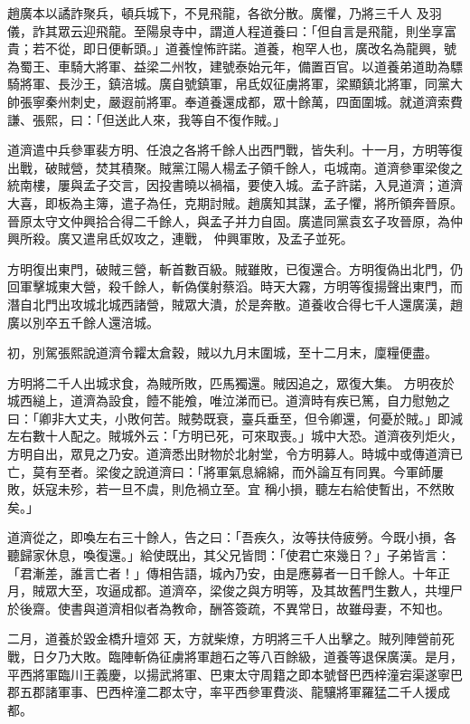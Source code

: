 \begin{pinyinscope}
 趙廣本以譎詐聚兵，頓兵城下，不見飛龍，各欲分散。廣懼，乃將三千人
 及羽儀，詐其眾云迎飛龍。至陽泉寺中，謂道人程道養曰：「但自言是飛龍，則坐享富貴；若不從，即日便斬頭。」道養惶怖許諾。道養，枹罕人也，廣改名為龍興，號為蜀王、車騎大將軍、益梁二州牧，建號泰始元年，備置百官。以道養弟道助為驃騎將軍、長沙王，鎮涪城。廣自號鎮軍，帛氐奴征虜將軍，梁顯鎮北將軍，同黨大帥張寧秦州刺史，嚴遐前將軍。奉道養還成都，眾十餘萬，四面圍城。就道濟索費謙、張熙，曰：「但送此人來，我等自不復作賊。」



 道濟遣中兵參軍裴方明、任浪之各將千餘人出西門戰，皆失利。十一月，方明等復出戰，破賊營，焚其積聚。賊黨江陽人楊孟子領千餘人，屯城南。道濟參軍梁俊之統南樓，屢與孟子交言，因投書曉以禍福，要使入城。孟子許諾，入見道濟；道濟大喜，即板為主簿，遣子為任，克期討賊。趙廣知其謀，孟子懼，將所領奔晉原。晉原太守文仲興拾合得二千餘人，與孟子并力自固。廣遣同黨袁玄子攻晉原，為仲興所殺。廣又遣帛氐奴攻之，連戰，
 仲興軍敗，及孟子並死。



 方明復出東門，破賊三營，斬首數百級。賊雖敗，已復還合。方明復偽出北門，仍回軍擊城東大營，殺千餘人，斬偽僕射蔡滔。時天大霧，方明等復揚聲出東門，而潛自北門出攻城北城西諸營，賊眾大潰，於是奔散。道養收合得七千人還廣漢，趙廣以別卒五千餘人還涪城。



 初，別駕張熙說道濟令糶太倉穀，賊以九月末圍城，至十二月末，廩糧便盡。



 方明將二千人出城求食，為賊所敗，匹馬獨還。賊因追之，眾復大集。
 方明夜於城西縋上，道濟為設食，饐不能飧，唯泣涕而已。道濟時有疾已篤，自力慰勉之曰：「卿非大丈夫，小敗何苦。賊勢既衰，臺兵垂至，但令卿還，何憂於賊。」即減左右數十人配之。賊城外云：「方明已死，可來取喪。」城中大恐。道濟夜列炬火，方明自出，眾見之乃安。道濟悉出財物於北射堂，令方明募人。時城中或傳道濟已亡，莫有至者。梁俊之說道濟曰：「將軍氣息綿綿，而外論互有同異。今軍師屢敗，妖寇未殄，若一旦不虞，則危禍立至。宜
 稱小損，聽左右給使暫出，不然敗矣。」



 道濟從之，即喚左右三十餘人，告之曰：「吾疾久，汝等扶侍疲勞。今既小損，各聽歸家休息，喚復還。」給使既出，其父兄皆問：「使君亡來幾日？」子弟皆言：「君漸差，誰言亡者！」傳相告語，城內乃安，由是應募者一日千餘人。十年正月，賊眾大至，攻逼成都。道濟卒，梁俊之與方明等，及其故舊門生數人，共埋尸於後齋。使書與道濟相似者為教命，酬答簽疏，不異常日，故雖母妻，不知也。



 二月，道養於毀金橋升壇郊
 天，方就柴燎，方明將三千人出擊之。賊列陣營前死戰，日夕乃大敗。臨陣斬偽征虜將軍趙石之等八百餘級，道養等退保廣漢。是月，平西將軍臨川王義慶，以揚武將軍、巴東太守周籍之即本號督巴西梓潼宕渠遂寧巴郡五郡諸軍事、巴西梓潼二郡太守，率平西參軍費淡、龍驤將軍羅猛二千人援成都。




\end{pinyinscope}

